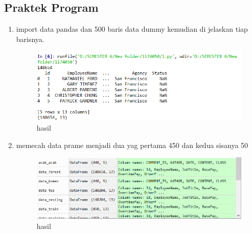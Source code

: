 \subsection{Praktek Program}
\begin{enumerate}
\item import data pandas dan 500 baris data dummy kemudian di jelaskan tiap barisnya.

\begin{figure}[ht]
\centering
\includegraphics[scale=0.5]{figures/1174050/chapter4/6.PNG}
\caption{hasil}
\label{Praktek no 1}
\end{figure}

\item memecah data prame menjadi dua yag pertama 450 dan kedua sisanya 50

\begin{figure}[ht]
\centering
\includegraphics[scale=0.5]{figures/1174050/chapter4/7.PNG}
\caption{hasil}
\label{Praktek no 2}
\end{figure}


\end{enumerate}
